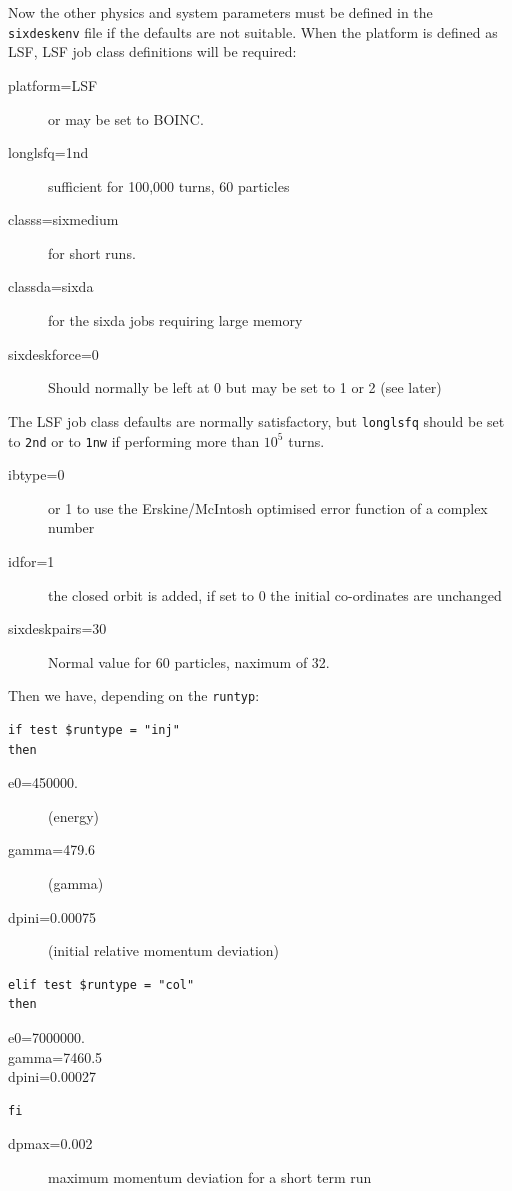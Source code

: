 \documentclass{cernatsnote}
\begin{document}
Now the other physics and system parameters must be defined in the {\tt
sixdeskenv} file if the defaults are not suitable.  When the platform is
defined as LSF, LSF job class definitions will be required:
\begin{description}
\item[platform=LSF] or may be set to BOINC.
\item[longlsfq=1nd] sufficient for 100,000 turns, 60 particles
\item[classs=sixmedium] for short runs.
\item[classda=sixda] for the sixda jobs requiring large memory
\item[sixdeskforce=0] Should normally be left at 0 but may be set to 1 or 2 (see later)
\end{description}
The LSF job class defaults are normally satisfactory, but \texttt{longlsfq}
should be set to \texttt{2nd} or to \texttt{1nw} if performing more than $10^5$ turns.

\begin{description}
\item[ibtype=0] or 1 to use the Erskine/McIntosh optimised error function
of a complex number
\item[idfor=1] the closed orbit is added, if set to 0 the initial co-ordinates are unchanged
\item[sixdeskpairs=30] Normal value for 60 particles, naximum of 32. 
\end{description}

Then we have, depending on the \texttt{runtyp}:
\begin{verbatim}
if test $runtype = "inj"
then
\end{verbatim}
\begin{description}
\item[e0=450000.] (energy)
\item[gamma=479.6] (gamma)
\item[dpini=0.00075] (initial relative momentum deviation)
\end{description}
\begin{verbatim}
elif test $runtype = "col"
then
\end{verbatim}
\begin{description}
\item[e0=7000000.]
\item[gamma=7460.5]
\item[dpini=0.00027]
\end{description}
\begin{verbatim}
fi
\end{verbatim}
\begin{description}
\item[dpmax=0.002] maximum momentum deviation for a short term run
\end{description}
\end{document}
